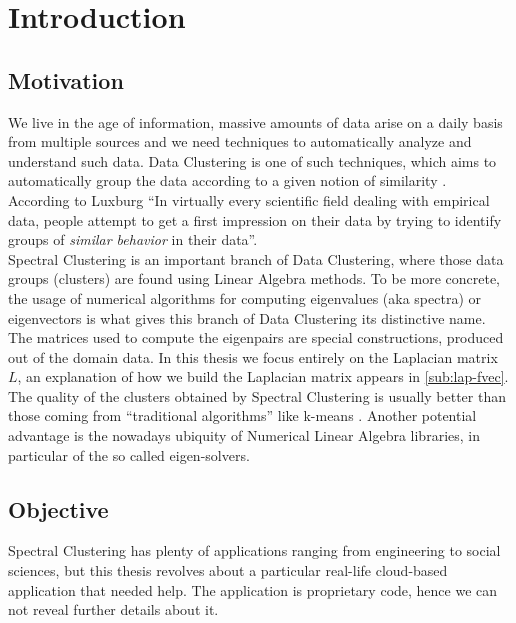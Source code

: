 \chapter{Introduction}

\section{Motivation}

We live in the age of information, massive amounts of data arise on a
daily basis from multiple sources and we need techniques to
automatically analyze and understand such data. Data Clustering is one
of such techniques, which aims to automatically group the data
according to a given notion of similarity \cite{pang06}. According to
Luxburg \cite{luxburg07} ``In virtually every  
scientific field dealing with empirical data, people attempt to get a
first impression on their data by
trying to identify groups of \emph{similar behavior} in their
data''. \\

Spectral Clustering is an important branch of Data Clustering, where
those data groups (clusters) are found using Linear Algebra
methods. To be more concrete, the usage of numerical algorithms for computing
eigenvalues (aka spectra) or eigenvectors is what gives this branch of
Data Clustering its distinctive  name. The matrices used to compute the
eigenpairs are special constructions, produced out of the domain
data. In this thesis we focus entirely on the \gls{Laplacian} matrix
$L$, an explanation of how we build the 
\gls{Laplacian} matrix appears in \cref{sub:lap-fvec}. \\

The quality of the clusters obtained by Spectral Clustering 
is usually better than those coming from ``traditional algorithms''
like k-means \cite{luxburg07}. Another potential advantage is the
nowadays ubiquity of Numerical Linear Algebra libraries, in particular
of the so called eigen-solvers. \\

\section{Objective}
\label{sec:objc}

Spectral Clustering has plenty of applications ranging from
engineering to social sciences, but this  
thesis revolves about a particular real-life cloud-based application
that needed help. The application is proprietary code, hence we can
not reveal further details about it. \\

